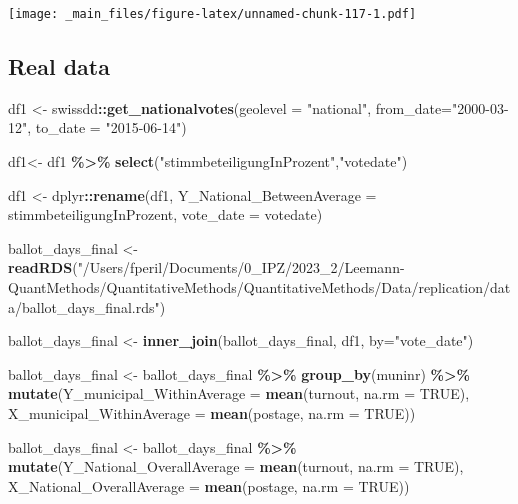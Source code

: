 \documentclass[
]{book}
\newenvironment{Shaded}{\begin{snugshade}}{\end{snugshade}}
\newcommand{\AttributeTok}[1]{\textcolor[rgb]{0.13,0.29,0.53}{#1}}
\newcommand{\ConstantTok}[1]{\textcolor[rgb]{0.56,0.35,0.01}{#1}}
\newcommand{\FunctionTok}[1]{\textcolor[rgb]{0.13,0.29,0.53}{\textbf{#1}}}
\newcommand{\NormalTok}[1]{#1}
\newcommand{\OtherTok}[1]{\textcolor[rgb]{0.56,0.35,0.01}{#1}}
\newcommand{\SpecialCharTok}[1]{\textcolor[rgb]{0.81,0.36,0.00}{\textbf{#1}}}
\newcommand{\StringTok}[1]{\textcolor[rgb]{0.31,0.60,0.02}{#1}}
\begin{document}
\texttt{[image: \_main\_files/figure-latex/unnamed-chunk-117-1.pdf]}

\hypertarget{real-data-2}{%
\subsection{Real data}\label{real-data-2}}

\begin{Shaded}
\begin{Highlighting}[]
\NormalTok{df1 }\OtherTok{\textless{}{-}}\NormalTok{ swissdd}\SpecialCharTok{::}\FunctionTok{get\_nationalvotes}\NormalTok{(}\AttributeTok{geolevel =} \StringTok{"national"}\NormalTok{, }\AttributeTok{from\_date=}\StringTok{"2000{-}03{-}12"}\NormalTok{, }\AttributeTok{to\_date =} \StringTok{"2015{-}06{-}14"}\NormalTok{)}

\NormalTok{df1}\OtherTok{\textless{}{-}}\NormalTok{ df1 }\SpecialCharTok{\%\textgreater{}\%}
  \FunctionTok{select}\NormalTok{(}\StringTok{"stimmbeteiligungInProzent"}\NormalTok{,}\StringTok{"votedate"}\NormalTok{)}
  
\NormalTok{df1 }\OtherTok{\textless{}{-}}\NormalTok{ dplyr}\SpecialCharTok{::}\FunctionTok{rename}\NormalTok{(df1, }\AttributeTok{Y\_National\_BetweenAverage =}\NormalTok{ stimmbeteiligungInProzent, }\AttributeTok{vote\_date =}\NormalTok{ votedate)}


\NormalTok{ballot\_days\_final }\OtherTok{\textless{}{-}} \FunctionTok{readRDS}\NormalTok{(}\StringTok{"/Users/fperil/Documents/0\_IPZ/2023\_2/Leemann{-}QuantMethods/QuantitativeMethods/QuantitativeMethods/Data/replication/data/ballot\_days\_final.rds"}\NormalTok{)  }

\NormalTok{ballot\_days\_final }\OtherTok{\textless{}{-}} \FunctionTok{inner\_join}\NormalTok{(ballot\_days\_final, df1, }\AttributeTok{by=}\StringTok{"vote\_date"}\NormalTok{)  }

\NormalTok{ballot\_days\_final }\OtherTok{\textless{}{-}}\NormalTok{ ballot\_days\_final }\SpecialCharTok{\%\textgreater{}\%}
  \FunctionTok{group\_by}\NormalTok{(muninr) }\SpecialCharTok{\%\textgreater{}\%}
  \FunctionTok{mutate}\NormalTok{(}\AttributeTok{Y\_municipal\_WithinAverage =} \FunctionTok{mean}\NormalTok{(turnout, }\AttributeTok{na.rm =} \ConstantTok{TRUE}\NormalTok{), }
         \AttributeTok{X\_municipal\_WithinAverage =} \FunctionTok{mean}\NormalTok{(postage, }\AttributeTok{na.rm =} \ConstantTok{TRUE}\NormalTok{))}


\NormalTok{ballot\_days\_final }\OtherTok{\textless{}{-}}\NormalTok{ ballot\_days\_final }\SpecialCharTok{\%\textgreater{}\%}
  \FunctionTok{mutate}\NormalTok{(}\AttributeTok{Y\_National\_OverallAverage =} \FunctionTok{mean}\NormalTok{(turnout, }\AttributeTok{na.rm =} \ConstantTok{TRUE}\NormalTok{),}
         \AttributeTok{X\_National\_OverallAverage =} \FunctionTok{mean}\NormalTok{(postage, }\AttributeTok{na.rm =} \ConstantTok{TRUE}\NormalTok{))}


\end{Highlighting}
\end{Shaded}
\end{document}
